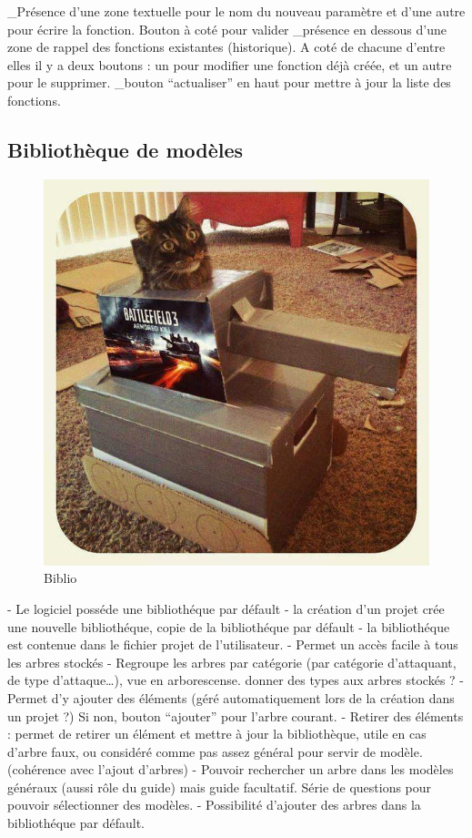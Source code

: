 		_Présence d’une zone textuelle pour le nom du nouveau paramètre et d’une autre pour écrire la fonction. Bouton à coté pour valider
		_présence en dessous d’une zone de rappel des fonctions existantes (historique). A coté de chacune d’entre elles il y a deux boutons : un pour modifier une fonction déjà créée, et un autre pour le supprimer.
		_bouton “actualiser” en haut pour mettre à jour la liste des fonctions.


	\subsection{Bibliothèque de modèles}
		\begin{figure}
			\begin{center}
				\includegraphics[width=1\textwidth]{figure/biblio.jpg}
			\end{center}
			\caption{Biblio}
			\label{fig:biblio}
		\end{figure}

		- Le logiciel posséde une bibliothéque par défault
		- la création d'un projet crée une nouvelle bibliothéque, copie de la bibliothéque par défault
		- la bibliothéque est contenue dans le fichier projet de l'utilisateur. 
		- Permet un accès facile à tous les arbres stockés
		- Regroupe les arbres par catégorie (par catégorie d’attaquant, de type d’attaque…), vue en arborescense. 	donner des types aux arbres stockés ?
		- Permet d’y ajouter des éléments (géré automatiquement lors de la création dans un projet ?) Si non, bouton “ajouter” pour l’arbre courant. 
		- Retirer des éléments : permet de retirer un élément et mettre à jour la bibliothèque, utile en cas d’arbre faux, ou considéré comme pas assez général pour servir de modèle. (cohérence avec l’ajout d’arbres)
		- Pouvoir rechercher un arbre dans les modèles généraux (aussi rôle du guide) mais guide facultatif. Série de questions pour pouvoir sélectionner des modèles.
		- Possibilité d'ajouter des arbres dans la bibliothéque par défault.

